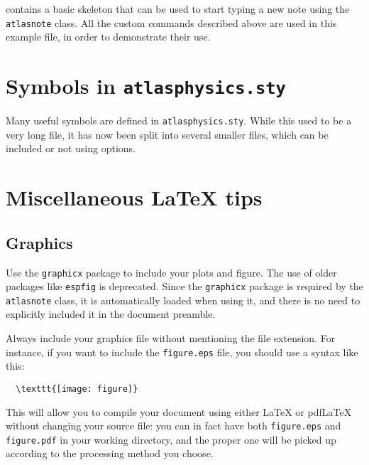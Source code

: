 \documentclass{style/atlasdoc}
\begin{document}
 contains a basic skeleton that can be
used to start typing a new note using the {\tt atlasnote} class. All
the custom commands described above are used in this example file, in
order to demonstrate their use.

\section{Symbols in \texttt{atlasphysics.sty}}
\label{sec:atlasphysics}

Many useful symbols are defined in \texttt{atlasphysics.sty}.
While this used to be a very long file, it has now been split into several smaller files,
which can be included or not using options.


\section{Miscellaneous \LaTeX{} tips}
\label{sec:latex}

\subsection{Graphics}

Use the {\tt graphicx} package \cite{} to include your plots and
figure. The use of older packages like {\tt espfig} is deprecated.
Since the {\tt graphicx} package is required by the {\tt atlasnote}
class, it is automatically loaded when using it, and there is no need
to explicitly included it in the document preamble.

Always include your graphics file without mentioning the file
extension. For instance, if you want to include the \texttt{figure.eps}
file, you should use a syntax like this:
\begin{verbatim}
  \texttt{[image: figure]}
\end{verbatim}
This will allow you to compile your document using either \LaTeX{} or
pdf\LaTeX{} without changing your source file: you can in fact have
both \texttt{figure.eps} and \texttt{figure.pdf} in your working directory,
and the proper one will be picked up according to the processing method
you choose.
\end{document}
